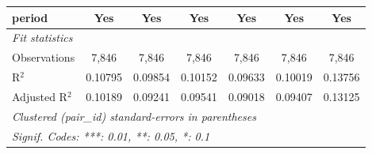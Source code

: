 \begin{tabular}{lcccccc}
   period          & Yes           & Yes            & Yes           & Yes            & Yes            & Yes\\  
   \midrule
   \emph{Fit statistics}\\
   Observations    & 7,846         & 7,846          & 7,846         & 7,846          & 7,846          & 7,846\\  
   R$^2$           & 0.10795       & 0.09854        & 0.10152       & 0.09633        & 0.10019        & 0.13756\\  
   Adjusted R$^2$  & 0.10189       & 0.09241        & 0.09541       & 0.09018        & 0.09407        & 0.13125\\  
   \midrule \midrule
   \multicolumn{7}{l}{\emph{Clustered (pair\_id) standard-errors in parentheses}}\\
   \multicolumn{7}{l}{\emph{Signif. Codes: ***: 0.01, **: 0.05, *: 0.1}}\\
\end{tabular}
\par\endgroup


